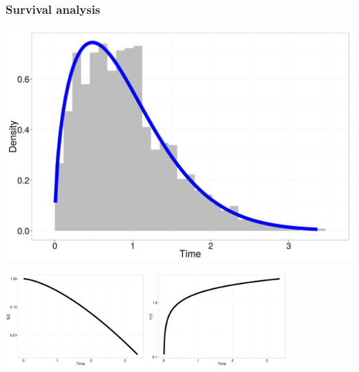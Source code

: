 \documentclass{beamer}
\begin{document}
\begin{frame}
  \frametitle{Survival analysis}

  \begin{center}
    \includegraphics[height = 0.5\textheight, width = \textwidth, keepaspectratio = true]{figure/dur_acc}

    \includegraphics[height = 0.5\textheight, width = 0.4\textwidth, keepaspectratio = true]{figure/sur_acc}
    \includegraphics[height = 0.5\textheight, width = 0.4\textwidth, keepaspectratio = true]{figure/haz_acc}
  \end{center}
\end{frame}
\end{document}
